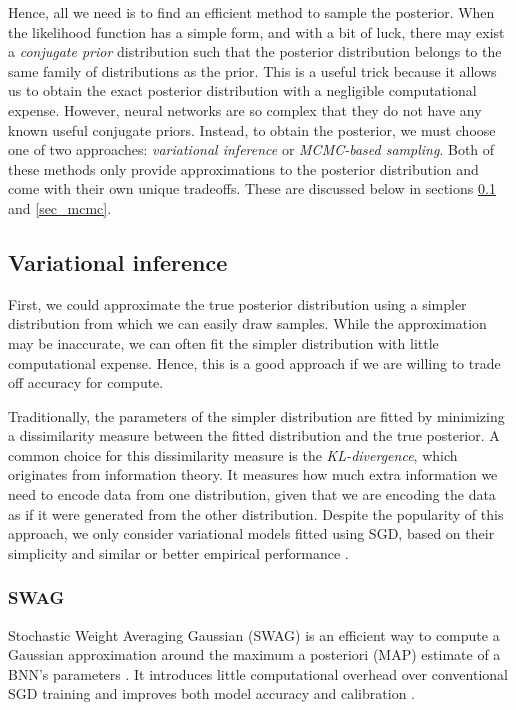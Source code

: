 \documentclass[12pt]{article}
\begin{document}
Hence, all we need is to find an efficient method to sample the posterior. When the likelihood function has a simple form, and with a bit of luck, there may exist a \textit{conjugate prior} distribution such that the posterior distribution belongs to the same family of distributions as the prior. This is a useful trick because it allows us to obtain the exact posterior distribution with a negligible computational expense. However, neural networks are so complex that they do not have any known useful conjugate priors. Instead, to obtain the posterior, we must choose one of two approaches: \textit{variational inference} or \textit{MCMC-based sampling}. Both of these methods only provide approximations to the posterior distribution and come with their own unique tradeoffs. These are discussed below in sections \ref{sec_vi} and \ref{sec_mcmc}.

\subsection{Variational inference}
\label{sec_vi}

First, we could approximate the true posterior distribution using a simpler distribution from which we can easily draw samples. While the approximation may be inaccurate, we can often fit the simpler distribution with little computational expense. Hence, this is a good approach if we are willing to trade off accuracy for compute.

Traditionally, the parameters of the simpler distribution are fitted by minimizing a dissimilarity measure between the fitted distribution and the true posterior. A common choice for this dissimilarity measure is the \textit{KL-divergence}, which originates from information theory. It measures how much extra information we need to encode data from one distribution, given that we are encoding the data as if it were generated from the other distribution. Despite the popularity of this approach, we only consider variational models fitted using SGD, based on their simplicity and similar or better empirical performance \cite{bnn_posterior}.

\subsubsection{SWAG}

Stochastic Weight Averaging Gaussian (SWAG) is an efficient way to compute a Gaussian approximation around the maximum a posteriori (MAP) estimate of a BNN's parameters \cite{swag}. It introduces little computational overhead over conventional SGD training and improves both model accuracy and calibration \cite{swag}.
\end{document}
